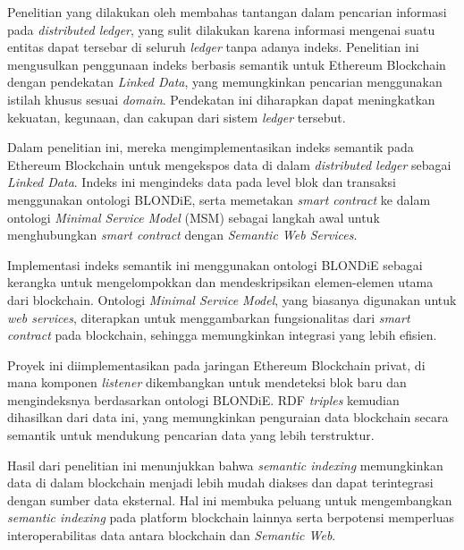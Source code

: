 Penelitian yang dilakukan oleh \parencite{third2017linked} membahas tantangan dalam pencarian informasi pada \textit{distributed ledger}, yang sulit dilakukan karena informasi mengenai suatu entitas dapat tersebar di seluruh \textit{ledger} tanpa adanya indeks. Penelitian ini mengusulkan penggunaan indeks berbasis semantik untuk Ethereum Blockchain dengan pendekatan \textit{Linked Data}, yang memungkinkan pencarian menggunakan istilah khusus sesuai \textit{domain}. Pendekatan ini diharapkan dapat meningkatkan kekuatan, kegunaan, dan cakupan dari sistem \textit{ledger} tersebut.

Dalam penelitian ini, mereka mengimplementasikan indeks semantik pada Ethereum Blockchain untuk mengekspos data di dalam \textit{distributed ledger} sebagai \textit{Linked Data}. Indeks ini mengindeks data pada level blok dan transaksi menggunakan ontologi BLONDiE, serta memetakan \textit{smart contract} ke dalam ontologi \textit{Minimal Service Model} (MSM) sebagai langkah awal untuk menghubungkan \textit{smart contract} dengan \textit{Semantic Web Services}.

Implementasi indeks semantik ini menggunakan ontologi BLONDiE sebagai kerangka untuk mengelompokkan dan mendeskripsikan elemen-elemen utama dari blockchain. Ontologi \textit{Minimal Service Model}, yang biasanya digunakan untuk \textit{web services}, diterapkan untuk menggambarkan fungsionalitas dari \textit{smart contract} pada blockchain, sehingga memungkinkan integrasi yang lebih efisien.

Proyek ini diimplementasikan pada jaringan Ethereum Blockchain privat, di mana komponen \textit{listener} dikembangkan untuk mendeteksi blok baru dan mengindeksnya berdasarkan ontologi BLONDiE. RDF \textit{triples} kemudian dihasilkan dari data ini, yang memungkinkan penguraian data blockchain secara semantik untuk mendukung pencarian data yang lebih terstruktur.

Hasil dari penelitian ini menunjukkan bahwa \textit{semantic indexing} memungkinkan data di dalam blockchain menjadi lebih mudah diakses dan dapat terintegrasi dengan sumber data eksternal. Hal ini membuka peluang untuk mengembangkan \textit{semantic indexing} pada platform blockchain lainnya serta berpotensi memperluas interoperabilitas data antara blockchain dan \textit{Semantic Web}.
